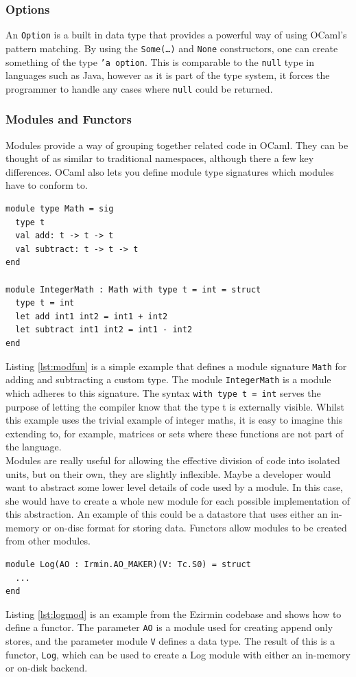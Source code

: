 \documentclass[12pt,a4paper,twoside,openright]{report}
\begin{document}
	\subsubsection*{Options}
	An \texttt{Option} is a built in data type that provides a powerful way of using OCaml's pattern matching.
	By using the \texttt{Some(\ldots)} and \texttt{None} constructors, one can create something of the type \texttt{'a option}. 
	This is comparable to the \texttt{null} type in languages such as Java, however as it is part of the type system, it forces the programmer to handle any cases where \texttt{null} could be returned. 

	\subsubsection*{Modules and Functors}
	Modules provide a way of grouping together related code in OCaml.
	They can be thought of as similar to traditional namespaces, although there a few key differences.
	OCaml also lets you define module type signatures which modules have to conform to.
	\begin{lstlisting}[caption={OCaml Modules and Functors},label={lst:modfun}]
module type Math = sig
  type t
  val add: t -> t -> t
  val subtract: t -> t -> t
end

module IntegerMath : Math with type t = int = struct 
  type t = int
  let add int1 int2 = int1 + int2
  let subtract int1 int2 = int1 - int2
end
	\end{lstlisting}
	Listing \ref{lst:modfun} is a simple example that defines a module signature \texttt{Math} for adding and subtracting a custom type.
	The module \texttt{IntegerMath} is a module which adheres to this signature. 
	The syntax \texttt{with type t = int} serves the purpose of letting the compiler know that the type t is externally visible.
	Whilst this example uses the trivial example of integer maths, it is easy to imagine this extending to, for example, matrices or sets where these functions are not part of the language.\\

	Modules are really useful for allowing the effective division of code into isolated units, but on their own, they are slightly inflexible. 
	Maybe a developer would want to abstract some lower level details of code used by a module.
	In this case, she would have to create a whole new module for each possible implementation of this abstraction.
	An example of this could be a datastore that uses either an in-memory or on-disc format for storing data.
	Functors allow modules to be created from other modules.
	\begin{lstlisting}[caption={Ezirmin Log Module},label={lst:logmod}]
module Log(AO : Irmin.AO_MAKER)(V: Tc.S0) = struct
  ...
end
	\end{lstlisting}
	Listing \ref{lst:logmod} is an example from the Ezirmin codebase and shows how to define a functor.
	The parameter \texttt{AO} is a module used for creating append only stores, and the parameter module \texttt{V} defines a data type.
	The result of this is a functor, \texttt{Log}, which can be used to create a Log module with either an in-memory or on-disk backend.
\end{document}
